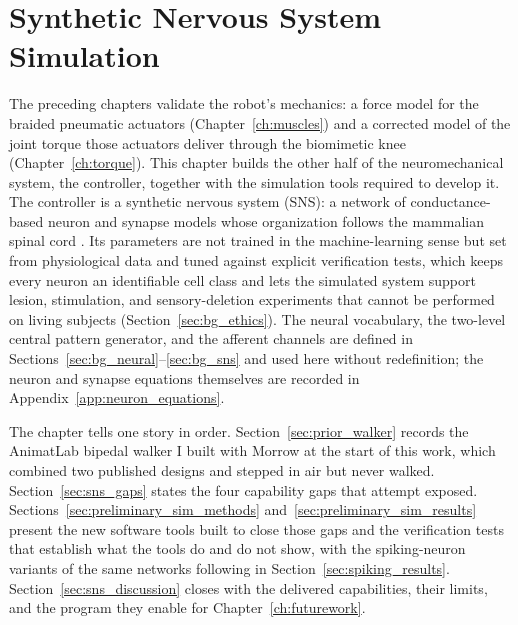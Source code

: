 \chapter{Synthetic Nervous System Simulation}\label{ch:sns}
\graphicspath{{D:/Github/Bipedal_Robot/Documentation/Reports and Papers/Dissertation/Figures/60-sns/}{figs/60-sns/}{D:/Github/Bipedal_Robot/Documentation/Reports and Papers/Dissertation/Figures/60-sns/AnimatLab_reference/}{figs/60-sns/AnimatLab_reference/}}

The preceding chapters validate the robot's mechanics: a force model for the braided pneumatic actuators (Chapter~\ref{ch:muscles}) and a corrected model of the joint torque those actuators deliver through the biomimetic knee (Chapter~\ref{ch:torque}). This chapter builds the other half of the neuromechanical system, the controller, together with the simulation tools required to develop it. The controller is a synthetic nervous system (SNS): a network of conductance-based neuron and synapse models whose organization follows the mammalian spinal cord \citep{rybak_modelling_2006, mccrea_organization_2008, deng_neuromechanical_2019}. Its parameters are not trained in the machine-learning sense but set from physiological data and tuned against explicit verification tests, which keeps every neuron an identifiable cell class and lets the simulated system support lesion, stimulation, and sensory-deletion experiments that cannot be performed on living subjects (Section~\ref{sec:bg_ethics}). The neural vocabulary, the two-level central pattern generator, and the afferent channels are defined in Sections~\ref{sec:bg_neural}--\ref{sec:bg_sns} and used here without redefinition; the neuron and synapse equations themselves are recorded in Appendix~\ref{app:neuron_equations}.

The chapter tells one story in order. Section~\ref{sec:prior_walker} records the AnimatLab bipedal walker I built with Morrow at the start of this work, which combined two published designs and stepped in air but never walked. Section~\ref{sec:sns_gaps} states the four capability gaps that attempt exposed. Sections~\ref{sec:preliminary_sim_methods} and~\ref{sec:preliminary_sim_results} present the new software tools built to close those gaps and the verification tests that establish what the tools do and do not show, with the spiking-neuron variants of the same networks following in Section~\ref{sec:spiking_results}. Section~\ref{sec:sns_discussion} closes with the delivered capabilities, their limits, and the program they enable for Chapter~\ref{ch:futurework}.

